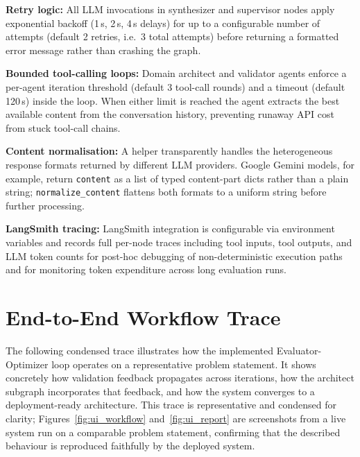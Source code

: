\textbf{Retry logic:} All LLM invocations in synthesizer and supervisor nodes apply exponential backoff (1\,s, 2\,s, 4\,s delays) for up to a configurable number of attempts (default 2 retries, i.e.\ 3 total attempts) before returning a formatted error message rather than crashing the graph.

\textbf{Bounded tool-calling loops:} Domain architect and validator agents enforce a per-agent iteration threshold (default 3 tool-call rounds) and a timeout (default 120\,s) inside the loop. When either limit is reached the agent extracts the best available content from the conversation history, preventing runaway API cost from stuck tool-call chains.

\textbf{Content normalisation:} A helper transparently handles the heterogeneous response formats returned by different LLM providers. Google Gemini models, for example, return \texttt{content} as a list of typed content-part dicts rather than a plain string; \texttt{normalize\_content} flattens both formats to a uniform string before further processing.

\textbf{LangSmith tracing:} LangSmith integration is configurable via environment variables and records full per-node traces including tool inputs, tool outputs, and LLM token counts for post-hoc debugging of non-deterministic execution paths and for monitoring token expenditure across long evaluation runs.

\section{End-to-End Workflow Trace}
\label{sec:workflow_trace}

The following condensed trace illustrates how the implemented Evaluator-Optimizer loop operates on a representative problem statement. It shows concretely how validation feedback propagates across iterations, how the architect subgraph incorporates that feedback, and how the system converges to a deployment-ready architecture. This trace is representative and condensed for clarity; Figures~\ref{fig:ui_workflow} and~\ref{fig:ui_report} are screenshots from a live system run on a comparable problem statement, confirming that the described behaviour is reproduced faithfully by the deployed system.


